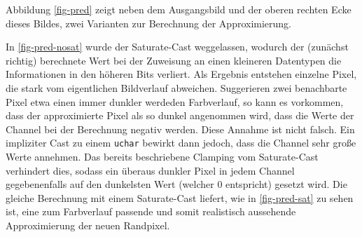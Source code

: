 \documentclass{whswinvcbook}
\begin{document}
Abbildung \ref{fig-pred} zeigt neben dem Ausgangsbild und der oberen rechten Ecke dieses Bildes, zwei Varianten zur Berechnung der Approximierung.

In \ref{fig-pred-nosat} wurde der Saturate-Cast weggelassen, wodurch der (zunächst richtig) berechnete Wert bei der Zuweisung an einen kleineren Datentypen die Informationen in den höheren Bits verliert. Als Ergebnis entstehen einzelne Pixel, die stark vom eigentlichen Bildverlauf abweichen. Suggerieren zwei benachbarte Pixel etwa einen immer dunkler werdeden Farbverlauf, so kann es vorkommen, dass der approximierte Pixel als so dunkel angenommen wird, dass die Werte der Channel bei der Berechnung negativ werden. Diese Annahme ist nicht falsch. Ein impliziter Cast zu einem \texttt{uchar} bewirkt dann jedoch, dass die Channel sehr große Werte annehmen. Das bereits beschriebene Clamping vom Saturate-Cast verhindert dies, sodass ein überaus dunkler Pixel in jedem Channel gegebenenfalls auf den dunkelsten Wert (welcher $0$ entspricht) gesetzt wird. Die gleiche Berechnung mit einem Saturate-Cast liefert, wie in \ref{fig-pred-sat} zu sehen ist, eine zum Farbverlauf passende und somit realistisch aussehende Approximierung der neuen Randpixel.
\end{document}
